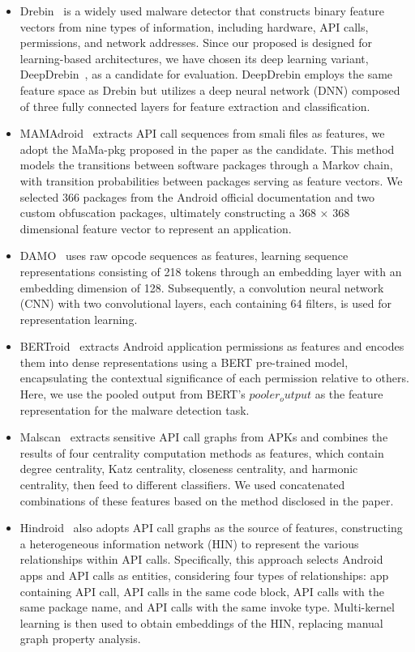\begin{itemize}
    \item Drebin~\cite{drebin} is a widely used malware detector that constructs binary feature vectors from nine types of information, including hardware, API calls, permissions, and network addresses. Since our proposed is designed for learning-based architectures, we have chosen its deep learning variant, DeepDrebin~\cite{deepdrebin}, as a candidate for evaluation. DeepDrebin employs the same feature space as Drebin but utilizes a deep neural network (DNN) composed of three fully connected layers for feature extraction and classification.
    \item MAMAdroid~\cite{Mamadroid} extracts API call sequences from smali files as features, we adopt the MaMa-pkg proposed in the paper as the candidate. This method models the transitions between software packages through a Markov chain, with transition probabilities between packages serving as feature vectors. We selected 366 packages from the Android official documentation and two custom obfuscation packages, ultimately constructing a 368 × 368 dimensional feature vector to represent an application.
    \item DAMO~\cite{damo} uses raw opcode sequences as features, learning sequence representations consisting of 218 tokens through an embedding layer with an embedding dimension of 128. Subsequently, a convolution neural network (CNN) with two convolutional layers, each containing 64 filters, is used for representation learning.
    \item BERTroid~\cite{bertroid} extracts Android application permissions as features and encodes them into dense representations using a BERT pre-trained model, encapsulating the contextual significance of each permission relative to others. Here, we use the pooled output from BERT’s $pooler_output$ as the feature representation for the malware detection task.
    \item Malscan~\cite{malscan} extracts sensitive API call graphs from APKs and combines the results of four centrality computation methods as features, which contain degree centrality, Katz centrality, closeness centrality, and harmonic centrality, then feed to different classifiers. We used concatenated combinations of these features based on the method disclosed in the paper.
    \item Hindroid~\cite{hindroid} also adopts API call graphs as the source of features, constructing a heterogeneous information network (HIN) to represent the various relationships within API calls. Specifically, this approach selects Android apps and API calls as entities, considering four types of relationships: app containing API call, API calls in the same code block, API calls with the same package name, and API calls with the same invoke type. Multi-kernel learning is then used to obtain embeddings of the HIN, replacing manual graph property analysis.
    
\end{itemize}
